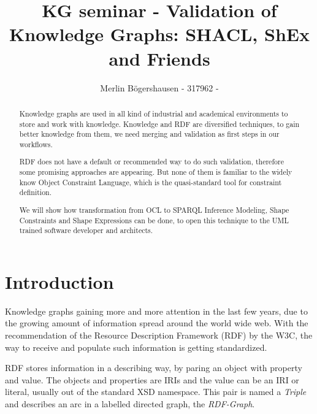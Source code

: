 \documentclass[runningheads]{llncs}
\begin{document}
\title{KG seminar - Validation of Knowledge Graphs: SHACL, ShEx and Friends}
\author{Merlin B\"ogershausen - 317962 - }
%
\maketitle              %
%
\begin{abstract}
    Knowledge graphs are used in all kind of industrial and academical environments to store and work with knowledge.
    Knowledge and RDF are diversified techniques, to gain better knowledge from them, we need merging and validation as first steps in our workflows.
    
    RDF does not have a default or recommended way to do such validation, therefore some promising approaches are appearing.
    But none of them is familiar to the widely know Object Constraint Language, which is the quasi-standard tool for constraint definition.

    We will show how transformation from OCL to SPARQL Inference Modeling, Shape Constraints and Shape Expressions can be done, to open this technique to the UML trained software developer and architects.
\end{abstract}
\section{Introduction}
Knowledge graphs gaining more and more attention in the last few years, due to the growing amount of information spread around the world wide web.
With the recommendation of the Resource Description Framework (RDF) by the W3C, the way to receive and populate such information is getting standardized.

RDF stores information in a describing way, by paring an object with property and value.
The objects and properties are IRIs and the value can be an IRI or literal, usually out of the standard XSD namespace.
This pair is named a \textit{Triple} and describes an arc in a labelled directed graph, the \textit{RDF-Graph}.
\end{document}
